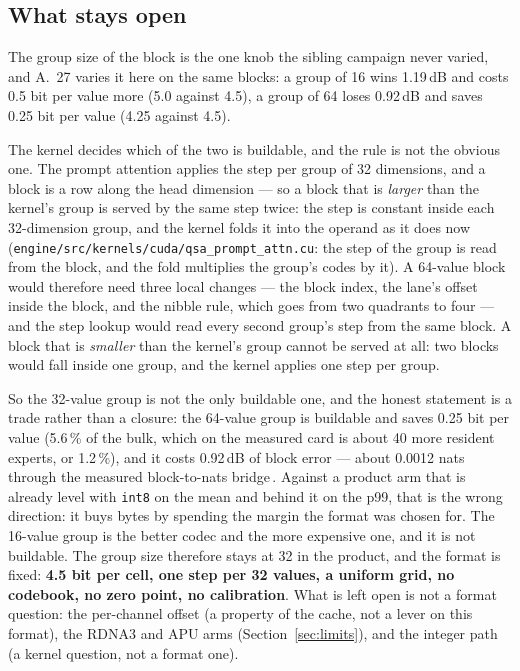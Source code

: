\documentclass[10pt,twocolumn]{article}
\begin{document}
\subsection{What stays open}

The group size of the block is the one knob the sibling campaign never varied, and A.~27 varies it here on
the same blocks: a group of 16 wins 1.19\,dB and costs 0.5 bit per value more (5.0 against 4.5), a group of
64 loses 0.92\,dB and saves 0.25 bit per value (4.25 against 4.5).

The kernel decides which of the two is buildable, and the rule is not the obvious one. The prompt attention
applies the step per group of 32 dimensions, and a block is a row along the head dimension --- so a block
that is \emph{larger} than the kernel's group is served by the same step twice: the step is constant inside
each 32-dimension group, and the kernel folds it into the operand as it does now
(\texttt{engine/src/kernels/cuda/qsa\_prompt\_attn.cu}: the step of the group is read from the block, and the fold
multiplies the group's codes by it). A 64-value block would therefore need three local changes --- the block
index, the lane's offset inside the block, and the nibble rule, which goes from two quadrants to four --- and
the step lookup would read every second group's step from the same block. A block that is \emph{smaller}
than the kernel's group cannot be served at all: two blocks would fall inside one group, and the kernel
applies one step per group.

So the 32-value group is not the only buildable one, and the honest statement is a trade rather than a
closure: the 64-value group is buildable and saves 0.25 bit per value (5.6\,\% of the bulk, which on the
measured card is about 40 more resident experts, or 1.2\,\%), and it costs 0.92\,dB of block error --- about
0.0012 nats through the measured block-to-nats bridge\,\cite{shear}. Against a product arm that is already
level with \texttt{int8} on the mean and behind it on the p99, that is the wrong direction: it buys bytes by
spending the margin the format was chosen for. The 16-value group is the better codec and the more
expensive one, and it is not buildable. The group size therefore stays at 32 in the product, and the format
is fixed: \textbf{4.5 bit per cell, one step per 32 values, a uniform grid, no codebook, no zero point, no
calibration}. What is left open is not a format question: the per-channel offset (a property of the cache,
not a lever on this format), the RDNA3 and APU arms (Section~\ref{sec:limits}), and the integer path
(a kernel question, not a format one).
\end{document}
